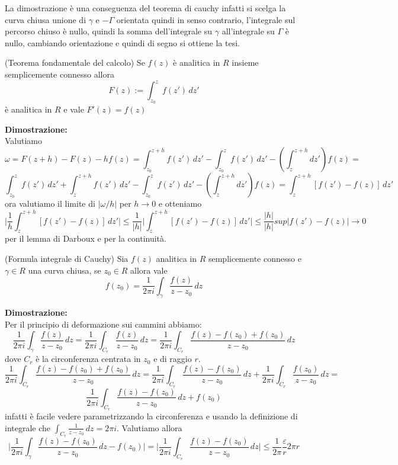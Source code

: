 La dimostrazione è una conseguenza del teorema di cauchy infatti si scelga la curva chiusa unione di $\gamma$ e $-\Gamma$ orientata quindi in senso contrario, l'integrale sul percorso chiuso è nullo, quindi la somma dell'integrale su $\gamma$ all'integrale su $\Gamma$ è nullo, cambiando orientazione e quindi di segno si ottiene la tesi.\\
\begin{thm}
(Teorema fondamentale del calcolo) Se $f(z)$ è analitica in $R$ insieme semplicemente connesso allora
\[F(z) := \int_{z_0}^z f(z')\,dz'\]
è analitica in $R$ e vale $F'(z) = f(z)$ 
\end{thm}
\hspace{-1.6em}\textbf{Dimostrazione:}\\
Valutiamo
\[\omega = F(z+h)-F(z)-hf(z) = \int_{z_0}^{z+h}f(z')\,dz' - \int_{z_0}^{z}f(z')\,dz' - \left(\int_{z}^{z+h}dz'\right)f(z) =   \]
\[\int_{z_0}^{z}f(z')\,dz' +\int_{z}^{z+h}f(z')\,dz' - \int_{z_0}^{z}f(z')\,dz' - \left(\int_{z}^{z+h}dz'\right)f(z) =\int_{z}^{z+h}[f(z')-f(z)]\,dz' \]
ora valutiamo il limite di $|\omega/h|$ per $h\to 0$ e otteniamo
\[\bigg|\frac{1}{h}\int_{z}^{z+h}[f(z')-f(z)]\,dz'\bigg|\leq\frac{1}{|h|}\bigg| \int_{z}^{z+h}[f(z')-f(z)]\,dz'\bigg|\leq \frac{|h|}{|h|} sup|f(z')-f(z)|\to 0 \]
per il lemma di Darboux e per la continuità.\\ 
\begin{thm}
(Formula integrale di Cauchy) Sia $f(z)$ analitica in $R$ semplicemente connesso e $\gamma\in R$ una curva chiusa, se $z_0\in R$ allora vale
\[f(z_0) = \frac{1}{2\pi i}\int_\gamma \frac{f(z)}{z-z_0}\, dz\]
\end{thm}
\hspace{-1.6em}\textbf{Dimostrazione:}\\
Per il principio di deformazione sui cammini abbiamo:
\[\frac{1}{2\pi i}\int_\gamma \frac{f(z)}{z-z_0}\, dz = \frac{1}{2\pi i}\int_{C_r} \frac{f(z)}{z-z_0}\, dz = \frac{1}{2\pi i}\int_{C_r} \frac{f(z)-f(z_0)+f(z_0)}{z-z_0}\, dz\]
dove $C_r$ è la circonferenza centrata in $z_0$ e di raggio $r$.
\[\frac{1}{2\pi i}\int_{C_r} \frac{f(z)-f(z_0)+f(z_0)}{z-z_0}\, dz = \frac{1}{2\pi i}\int_{C_r} \frac{f(z)-f(z_0)}{z-z_0}\, dz +\frac{1}{2\pi i}\int_{C_r} \frac{f(z_0)}{z-z_0}\, dz = \]
\[\frac{1}{2\pi i}\int_{C_r} \frac{f(z)-f(z_0)}{z-z_0}\, dz +f(z_0) \]
infatti è facile vedere parametrizzando la circonferenza e usando la definizione di integrale che $\int_{C_r}\frac{1}{z-z_0}\, dz = 2\pi i$. Valutiamo allora
\[\bigg|\frac{1}{2\pi i}\int_{\gamma} \frac{f(z)-f(z_0)}{z-z_0}\, dz - f(z_0)\bigg| =\bigg|\frac{1}{2\pi i}\int_{C_r} \frac{f(z)-f(z_0)}{z-z_0}\, dz\bigg|\leq \frac{1}{2\pi}\frac{\varepsilon}{r}2 \pi r \]
